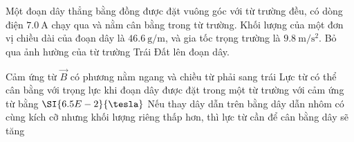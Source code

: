 \begin{ex}
	Một đoạn dây thẳng bằng đồng được đặt vuông góc với từ trường đều, có dòng điện $\SI{7.0}{\ampere}$ chạy qua và nằm cân bằng trong từ trường. Khối lượng của một đơn vị chiều dài của đoạn dây là $\SI{46.6}{\gram/\meter}$, và gia tốc trọng trường là $\SI{9.8}{\meter/\second^2}$. Bỏ qua ảnh hường của từ trường Trái Đất lên đoạn dây.
	\begin{center}
	\end{center}
	{Cảm ứng từ $\vec{B}$ có phương nằm ngang và chiều từ phải sang trái}
	{\True Lực từ có thể cân bằng với trọng lực khi đoạn dây được đặt trong một từ trường với cảm ứng từ bằng $\SI{6.5E-2}{\tesla}$}
	{Nếu thay dây dẫn trên bằng dây dẫn nhôm có cùng kích cỡ nhưng khối lượng riêng thấp hơn, thì lực từ cần để cân bằng dây sẽ tăng}
\end{ex}
